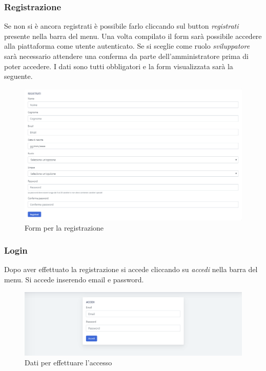     \subsubsection{Registrazione}
    Se non si è ancora registrati è possibile farlo cliccando sul button \textit{registrati} presente nella barra del menu.
    Una volta compilato il form sarà possibile accedere alla piattaforma come utente autenticato.
    Se si sceglie come ruolo \textit{sviluppatore} sarà necessario attendere una conferma da parte dell'amministratore prima di poter 
    accedere.
    I dati sono tutti obbligatori e la form visualizzata sarà la seguente.
    \begin{figure}[H]
        \centering
        \includegraphics[width=1\linewidth]{sez/img/autenticazione/formRegistrazione.png} 
        \caption{Form per la registrazione}\label{fig:1}
    \end{figure}

    \subsubsection{Login}
    Dopo aver effettuato la registrazione si accede cliccando su \textit{accedi} nella barra del menu.
    Si accede inserendo email e password.
    \begin{figure}[H]
        \centering
        \includegraphics[width=1\linewidth]{sez/img/autenticazione/formAccedi.png} 
        \caption{Dati per effettuare l'accesso}\label{fig:1}
    \end{figure}

